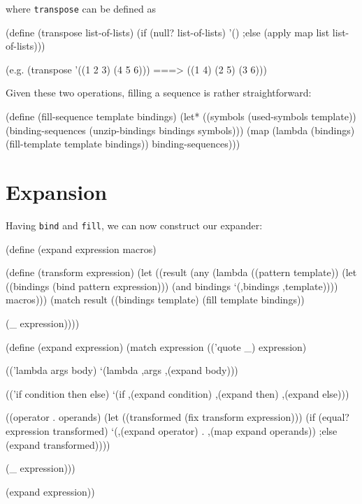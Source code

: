 where \texttt{transpose} can be defined as

\begin{Snippet}
  (define (transpose list-of-lists)
    (if (null? list-of-lists)
       '()
    ;else
       (apply map list list-of-lists)))
\end{Snippet}
\begin{Snippet}
  (e.g. (transpose '((1 2 3)
                     (4 5 6))) ===> ((1 4)
                                     (2 5)
                                     (3 6)))
\end{Snippet}

Given these two operations, filling a sequence is rather
straightforward:

\begin{Snippet}
  (define (fill-sequence template bindings)
    (let* ((symbols (used-symbols template))
	   (binding-sequences (unzip-bindings bindings symbols)))
      (map (lambda (bindings)
	     (fill-template template bindings))
	   binding-sequences)))
\end{Snippet}

\section{Expansion}

Having \texttt{bind} and \texttt{fill}, we can now construct our expander:

\begin{Snippet}
(define (expand expression macros)
  
  (define (transform expression)
    (let ((result (any (lambda ((pattern template))
			 (let ((bindings (bind pattern
					       expression)))
			   (and bindings
				`(,bindings ,template))))
		       macros)))
      (match result
	((bindings template)
	 (fill template bindings))

	(_
	 expression))))
\end{Snippet}
\begin{Snippet}
  (define (expand expression)
    (match expression
      (('quote _)
       expression)
\end{Snippet}
\begin{Snippet}
      (('lambda args body)
       `(lambda ,args ,(expand body)))
\end{Snippet}
\begin{Snippet}
      (('if condition then else)
       `(if ,(expand condition)
	    ,(expand then)
	    ,(expand else)))
\end{Snippet}
\begin{Snippet}
      ((operator . operands)
       (let ((transformed (fix transform expression)))
	 (if (equal? expression transformed)
	     `(,(expand operator) . ,(map expand operands))
         ;else
             (expand transformed))))
\end{Snippet}
\begin{Snippet}
      (_
       expression)))

  (expand expression))
\end{Snippet}

